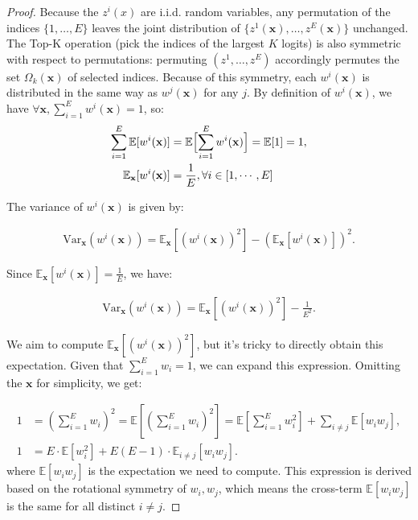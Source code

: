 \begin{proof}
Because the \(z^i(x)\) are i.i.d. random variables, any permutation of the indices \(\{1,\dots,E\}\) leaves the joint distribution of \(\{z^1(\mathbf{x}),\dots,z^E(\mathbf{x})\}\) unchanged.  
The Top-K operation (pick the indices of the largest \(K\) logits) is also symmetric with respect to permutations: permuting \((z^1,\dots,z^E)\) accordingly permutes the set \(\Omega_k(\mathbf{x})\) of selected indices.
Because of this symmetry, each \(w^i(\mathbf{x})\) is distributed in the same way as \(w^j(\mathbf{x})\) for any \(j\). 
By definition of $w^i(\mathbf{x})$, we have $\forall \mathbf{x}, \sum_{i=1}^E w^i(\mathbf{x}) = 1$, so: 
\vspace{-5pt}
\begin{align}
    \sum_{i=1}^E \mathbb{E}[w^i(\mathbf{x})] 
    &= \mathbb{E}\Bigl[\sum_{i=1}^E w^i(\mathbf{x})\Bigr]
    = \mathbb{E}[1]
    = 1, \\
    \mathbb{E}_{\mathbf{x}}[w^i(\mathbf{x})] &= \frac{1}{E}, \forall i \in [1,\cdots, E]
\end{align}

The variance of \( w^i(\mathbf{x}) \) is given by:

\begin{align}
\text{Var}_{\mathbf{x}}(w^i(\mathbf{x})) = \mathbb{E}_{\mathbf{x}}\left[ \left( w^i(\mathbf{x}) \right)^2 \right] - \left( \mathbb{E}_{\mathbf{x}}\left[ w^i(\mathbf{x}) \right] \right)^2.
\end{align}

Since \( \mathbb{E}_{\mathbf{x}}\left[ w^i(\mathbf{x}) \right] = \frac{1}{E} \), we have:

\begin{align}
\text{Var}_{\mathbf{x}}(w^i(\mathbf{x})) = \mathbb{E}_{\mathbf{x}}\left[ \left( w^i(\mathbf{x}) \right)^2 \right] - \frac{1}{E^2}.\label{eq:var}
\end{align}

We aim to compute \( \mathbb{E}_{\mathbf{x}}\left[ \left( w^i(\mathbf{x}) \right)^2 \right] \), but it's tricky to directly obtain this expectation.  Given that $\sum_{i=1}^E w_i = 1$, 
we can expand this expression. Omitting the \(\mathbf{x}\) for simplicity, we get:

\begin{align}
1 &= \left( \sum_{i=1}^E w_i \right)^2 = \mathbb{E}\left[ \left( \sum_{i=1}^E w_i \right)^2 \right] = \mathbb{E}\left[ \sum_{i=1}^E w_i^2 \right] + \sum_{i\neq j} \mathbb{E}[w_i w_j], \\
1&= E \cdot \mathbb{E}[w_i^2] + E(E-1) \cdot \mathbb{E}_{i\neq j}[w_i w_j]. \label{eq:E}
\end{align}
where \( \mathbb{E}[w_i w_j] \) is the expectation we need to compute. This expression is derived based on the rotational symmetry of \(w_i, w_j\), which means the cross-term \( \mathbb{E}[w_i w_j] \) is the same for all distinct \(i \neq j\).


\end{proof}
